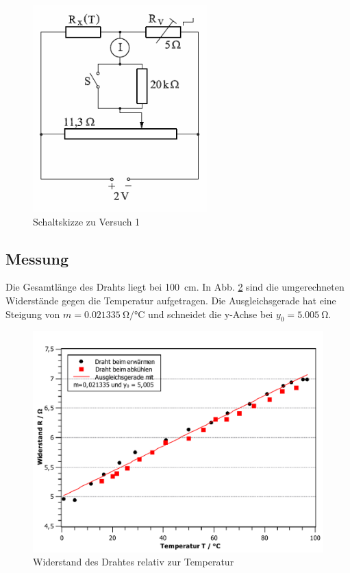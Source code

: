 \documentclass[11pt,a4paper,titlepage, ngerman]{article}
\begin{document}
			\begin{figure}[ht]
				\centering
				\includegraphics[width=0.6\textwidth]{Versuch2.png}
				\caption{Schaltskizze zu Versuch 1}
				\label{Schaltskizze2}
			\end{figure}
		
		\subsection{Messung}
			
			Die Gesamtlänge des Drahts liegt bei \SI{100}{cm}. In Abb. \ref{fig:drahtRT} sind die umgerechneten Widerstände gegen die Temperatur aufgetragen. Die Ausgleichsgerade hat eine Steigung von $m = \SI{0,021335}{\ohm\per\celsius}$ und schneidet die y-Achse bei $y_0 = \SI{5,005}{\ohm}$.
			
			\begin{figure}[ht]
				\centering
				\includegraphics[width=\textwidth]{KennlinieDrahtRT_2.pdf}
				\caption{Widerstand des Drahtes relativ zur Temperatur}
				\label{fig:drahtRT}
			\end{figure}
			
\end{document}
